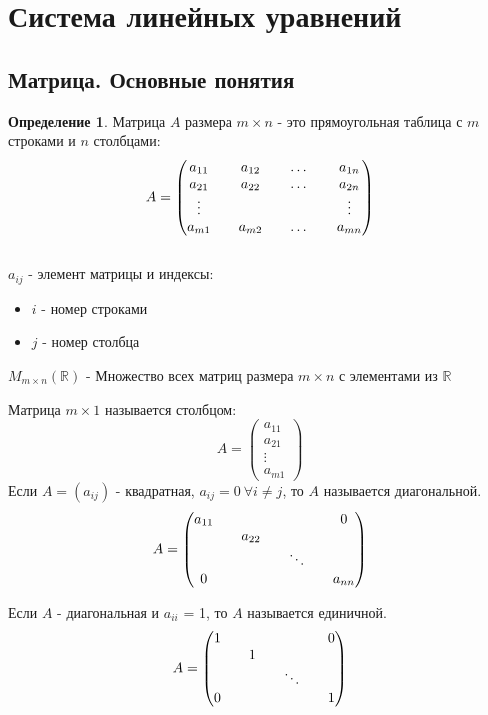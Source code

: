 \documentclass[a4paper, 12pt]{article}
\newcommand{\R}{\mathbb R}
\theoremstyle{definition}
\newtheorem*{definition}{Определение}
\begin{document}
  \section{Система линейных уравнений}
  \subsection{Матрица. Основные понятия}
  \begin{definition}
    Матрица $A$ размера $m\times n$ - это прямоугольная таблица с $m$ строками и $n$ столбцами:
    $$ A= \begin{pmatrix}
      a_{11} && a_{12} && \dots && a_{1n}\\
      a_{21} && a_{22} && \dots && a_{2n}\\
      \vdots && \null && \null && \vdots\\
      a_{m1} && a_{m2} && \dots && a_{mn}
    \end{pmatrix}$$ \\
    $a_{ij}$ - элемент матрицы и индексы:

    \begin{itemize}
      \item $i$ - номер строками
      \item $j$ - номер столбца
    \end{itemize}
    
    $M_{m\times n}(\R)$ - Множество всех матриц размера $m\times n$ с элементами из $\R$
    \end{definition}
    Матрица $m\times 1$ называется столбцом:
    $$ A= 
    \begin{pmatrix}
      a_{11} \\
      a_{21} \\
      \vdots \\
      a_{m1} 
    \end{pmatrix} $$
    Если $A=(a_{ij})$ - квадратная, $a_{ij} = 0\ \forall i \neq j$, то $A$ называется диагональной.
    $$ A =
    \begin{pmatrix}
      a_{11} && \null && \null && 0 \\
      \null && a_{22} && \null && \null \\
      \null && \null && \ddots && \null \\
      0 && \null && \null && a_{nn} 
    \end{pmatrix} $$

    Если $A$ - диагональная и $a_{ii}$ = 1, то $A$ называется единичной.
    $$ A =
    \begin{pmatrix}
      1 && \null && \null && 0 \\
      \null && 1 && \null && \null \\
      \null && \null && \ddots && \null \\
      0 && \null && \null && 1 
    \end{pmatrix} $$
\end{document}
